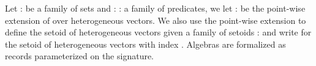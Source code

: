 Let  :    be a family of sets and
 : \AgdaSymbol{\{} : \AgdaSymbol{\}}   
  a
family of predicates, we let \AgdaSymbol{*} :  \AgdaSymbol{\{}\AgdaSymbol{\}}
      be the
point-wise extension of  over heterogeneous vectors. We also use
the point-wise extension to define the setoid of heterogeneous vectors
given a family of setoids  :    and write
   for the
setoid of heterogeneous vectors with index . Algebras are
formalized as records parameterized on the signature.


\begin{code}
\>[0]\AgdaSpace{}%
\AgdaSpace{}%
\AgdaSymbol{(}\AgdaSpace{}%
\AgdaSymbol{:}\AgdaSpace{}%
\AgdaSymbol{)}\AgdaSpace{}%
\AgdaSymbol{:}\AgdaSpace{}%
\AgdaSpace{}%
\<%
\\
\>[0][@{}l@{\AgdaIndent{0}}]%
\>[2]\<%
\\
\>[2][@{}l@{\AgdaIndent{0}}]%
\>[4]%
\>[12]\AgdaSymbol{:}\AgdaSpace{}%
\AgdaSpace{}%
\AgdaSpace{}%
\AgdaSpace{}%
\AgdaSpace{}%
\\
%
\>[4]%
\>[13]\AgdaSymbol{:}\AgdaSpace{}%
\AgdaSpace{}%
\AgdaSymbol{\{}\AgdaSpace{}%
\AgdaSymbol{\}}\AgdaSpace{}%
\AgdaSpace{}%
\AgdaSpace{}%
\AgdaSpace{}%
\AgdaSymbol{(}\AgdaSpace{}%
\AgdaOperator{\AgdaInductiveConstructor{,}}\AgdaSpace{}%
\AgdaSymbol{)}\AgdaSpace{}%
\AgdaSpace{}%
\AgdaSpace{}%
\AgdaSpace{}%
\AgdaSpace{}%
\AgdaSpace{}%
\AgdaSpace{}%
\<%
\end{code}



